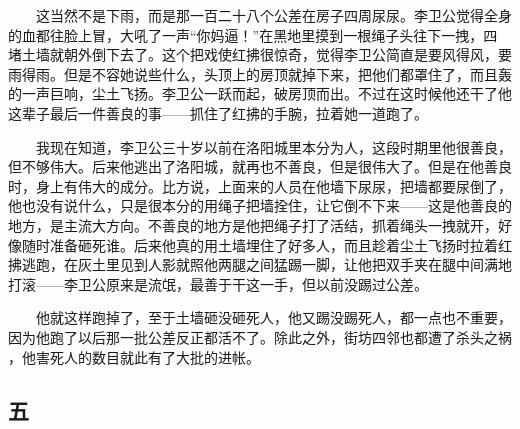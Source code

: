  　　这当然不是下雨，而是那一百二十八个公差在房子四周尿尿。李卫公觉得全身 的血都往脸上冒，大吼了一声“你妈逼！”在黑地里摸到一根绳子头往下一拽，四 堵土墙就朝外倒下去了。这个把戏使红拂很惊奇，觉得李卫公简直是要风得风，要 雨得雨。但是不容她说些什么，头顶上的房顶就掉下来，把他们都罩住了，而且轰 的一声巨响，尘土飞扬。李卫公一跃而起，破房顶而出。不过在这时候他还干了他 这辈子最后一件善良的事——抓住了红拂的手腕，拉着她一道跑了。 

　　我现在知道，李卫公三十岁以前在洛阳城里本分为人，这段时期里他很善良， 但不够伟大。后来他逃出了洛阳城，就再也不善良，但是很伟大了。但是在他善良 时，身上有伟大的成分。比方说，上面来的人员在他墙下尿尿，把墙都要尿倒了， 他也没有说什么，只是很本分的用绳子把墙拴住，让它倒不下来——这是他善良的 地方，是主流大方向。不善良的地方是他把绳子打了活结，抓着绳头一拽就开，好 像随时准备砸死谁。后来他真的用土墙埋住了好多人，而且趁着尘土飞扬时拉着红 拂逃跑，在灰土里见到人影就照他两腿之间猛踢一脚，让他把双手夹在腿中间满地 打滚——李卫公原来是流氓，最善于干这一手，但以前没踢过公差。

 　　他就这样跑掉了，至于土墙砸没砸死人，他又踢没踢死人，都一点也不重要， 因为他跑了以后那一批公差反正都活不了。除此之外，街坊四邻也都遭了杀头之祸 ，他害死人的数目就此有了大批的进帐。 
 
 
\subsection{五} 
 
